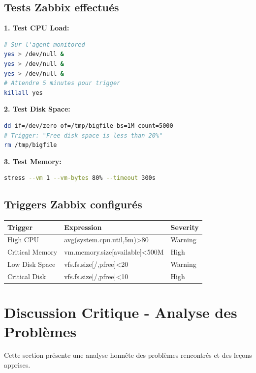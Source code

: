 \documentclass[12pt,a4paper]{article}
\begin{document}
\subsection{Tests Zabbix effectués}

\textbf{1. Test CPU Load:}
\begin{lstlisting}[language=bash]
# Sur l'agent monitored
yes > /dev/null &
yes > /dev/null &
yes > /dev/null &
# Attendre 5 minutes pour trigger
killall yes
\end{lstlisting}

\textbf{2. Test Disk Space:}
\begin{lstlisting}[language=bash]
dd if=/dev/zero of=/tmp/bigfile bs=1M count=5000
# Trigger: "Free disk space is less than 20%"
rm /tmp/bigfile
\end{lstlisting}

\textbf{3. Test Memory:}
\begin{lstlisting}[language=bash]
stress --vm 1 --vm-bytes 80% --timeout 300s
\end{lstlisting}

\subsection{Triggers Zabbix configurés}

\begin{center}
\begin{tabular}{|l|l|l|}
\hline
\textbf{Trigger} & \textbf{Expression} & \textbf{Severity} \\
\hline
High CPU & avg(system.cpu.util,5m)>80 & Warning \\
Critical Memory & vm.memory.size[available]<500M & High \\
Low Disk Space & vfs.fs.size[/,pfree]<20 & Warning \\
Critical Disk & vfs.fs.size[/,pfree]<10 & High \\
\hline
\end{tabular}
\end{center}

\section{Discussion Critique - Analyse des Problèmes}

Cette section présente une analyse honnête des problèmes rencontrés et des leçons apprises.
\end{document}
